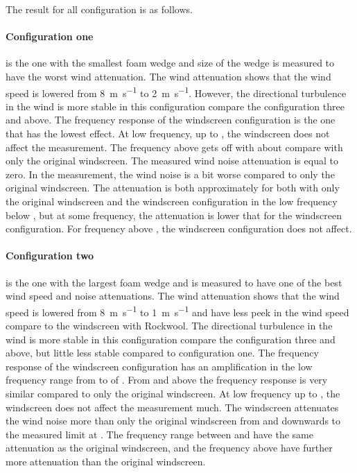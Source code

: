 The result for all configuration is as follows.

\paragraph{Configuration one} is the one with the smallest foam wedge and size of the wedge is measured to have the worst wind attenuation. The wind attenuation shows that the wind speed is lowered from \SI{8}{\meter\per\second} to \SI{2}{\meter\per\second}. However, the directional turbulence in the wind is more stable in this configuration compare the configuration three and above. The frequency response of the windscreen configuration is the one that has the lowest effect. At low frequency, up to , the windscreen does not affect the measurement. The frequency above  gets off with about  compare with only the original windscreen. The measured wind noise attenuation is equal to zero. In the measurement, the wind noise is a bit worse compared to only the original windscreen. The attenuation is both approximately  for both with only the original windscreen and the windscreen configuration in the low frequency below , but at some frequency, the attenuation is lower that  for the windscreen configuration. For frequency above , the windscreen configuration does not affect.

\paragraph{Configuration two} is the one with the largest foam wedge and is measured to have one of the best wind speed and noise attenuations. The wind attenuation shows that the wind speed is lowered from \SI{8}{\meter\per\second} to \SI{1}{\meter\per\second} and have less peek in the wind speed compare to the windscreen with Rockwool. The directional turbulence in the wind is more stable in this configuration compare the configuration three and above, but little less stable compared to configuration one. The frequency response of the windscreen configuration has an amplification in the low frequency range from  to  of  . From  and above the frequency response is very similar compared to only the original windscreen. At low frequency up to , the windscreen does not affect the measurement much. The windscreen attenuates the wind noise  more than only the original windscreen from  and downwards to the measured limit at . The frequency range between  and  have the same attenuation as the original windscreen, and the frequency above have further  more attenuation than the original windscreen.

